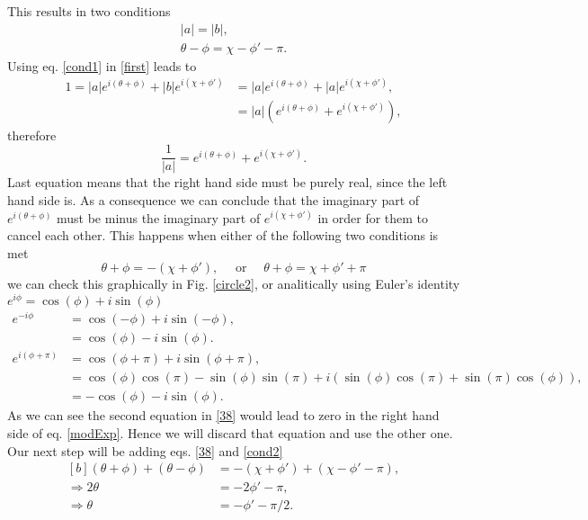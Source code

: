 This results in two conditions 
\begin{eqnarray}
    |a| = |b|, \label{cond1}\\
     \theta-\phi = \chi-\phi'-\pi. \label{cond2}
\end{eqnarray}
Using eq. \ref{cond1} in \ref{first} leads to
\begin{equation*}
\begin{aligned}
    1= |a|e^{i(\theta+\phi)} + |b|e^{i(\chi+\phi')} &= |a|e^{i(\theta+\phi)} + |a|e^{i(\chi+\phi')},\\
    & = |a|\left(e^{i(\theta+\phi)} + e^{i(\chi+\phi')}\right),
\end{aligned}
\end{equation*}
therefore
\begin{equation}
    \frac{1}{|a|} = e^{i(\theta+\phi)} + e^{i(\chi+\phi')}.\label{modExp}
\end{equation}
Last equation means that the right hand side must be purely real, since the left hand side is. As a consequence we can conclude that the imaginary part of $e^{i(\theta+\phi)}$ must be minus the imaginary part of $e^{i(\chi+\phi')}$ in order for them to cancel each other. This happens when either of the following two conditions is met 
\begin{equation}
    \theta+\phi = - (\chi+\phi'), \quad \text{ or } \quad\theta+\phi = \chi+\phi' + \pi \label{38}
\end{equation}
we can check this graphically in Fig. \ref{circle2}, or analitically using Euler's identity $e^{i\phi} = \cos(\phi) + i\sin(\phi)$
\begin{equation*}
\begin{aligned}
    e^{-i\phi} &= \cos(-\phi) + i\sin(-\phi),\\
     &= \cos(\phi) - i\sin(\phi).\\
     e^{i(\phi+\pi)} &= \cos(\phi+\pi) + i\sin(\phi+\pi),\\
     &= \cos(\phi)\cos(\pi) - \sin(\phi)\sin(\pi) + i(\sin(\phi)\cos(\pi) + \sin(\pi)\cos(\phi)),\\
     &= -\cos(\phi) - i\sin(\phi).
\end{aligned}
\end{equation*}
As we can see the second equation in \ref{38} would lead to zero in the right hand side of eq. \ref{modExp}. Hence we will discard that equation and use the other one. Our next step will be adding eqs. \ref{38} and \ref{cond2}
\begin{equation}
    \begin{aligned}[b]
        (\theta+\phi) + (\theta-\phi)&= - (\chi+\phi') + (\chi-\phi'-\pi),\\
        \Rightarrow 2\theta &= -2\phi' - \pi,\\
        \Rightarrow \theta &= -\phi' - \pi/2.
    \end{aligned}
    \label{42}
\end{equation}
